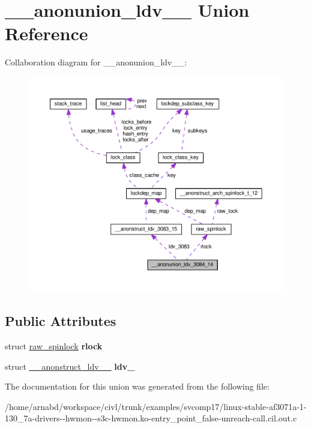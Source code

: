 \hypertarget{union____anonunion__ldv__3084__14}{}\section{\+\_\+\+\_\+anonunion\+\_\+ldv\+\_\+\_ Union Reference}
\label{union____anonunion__ldv__3084__14}


Collaboration diagram for \+\_\+\+\_\+anonunion\+\_\+ldv\+\_\+\_\+:
\nopagebreak
\begin{figure}[H]
\begin{center}
\leavevmode
\includegraphics[width=350pt]{union____anonunion__ldv__3084__14__coll__graph}
\end{center}
\end{figure}
\subsection*{Public Attributes}
\begin{DoxyCompactItemize}
\item 
\hypertarget{union____anonunion__ldv__3084__14_a4f7668116abe6ebe9b7f96216658bf20}{}struct \hyperlink{structraw__spinlock}{raw\+\_\+spinlock} {\bfseries rlock}\label{union____anonunion__ldv__3084__14_a4f7668116abe6ebe9b7f96216658bf20}

\item 
\hypertarget{union____anonunion__ldv__3084__14_a85af4f12f4237591c590af2c0fb9affc}{}struct \hyperlink{struct____anonstruct__ldv__3083__15}{\+\_\+\+\_\+anonstruct\+\_\+ldv\+\_\+\_} {\bfseries ldv\+\_}\label{union____anonunion__ldv__3084__14_a85af4f12f4237591c590af2c0fb9affc}

\end{DoxyCompactItemize}


The documentation for this union was generated from the following file\+:\begin{DoxyCompactItemize}
\item 
/home/arnabd/workspace/civl/trunk/examples/svcomp17/linux-\/stable-\/af3071a-\/1-\/130\+\_\+7a-\/drivers-\/-\/hwmon-\/-\/s3c-\/hwmon.\+ko-\/entry\+\_\+point\+\_\+false-\/unreach-\/call.\+cil.\+out.\+c\end{DoxyCompactItemize}
